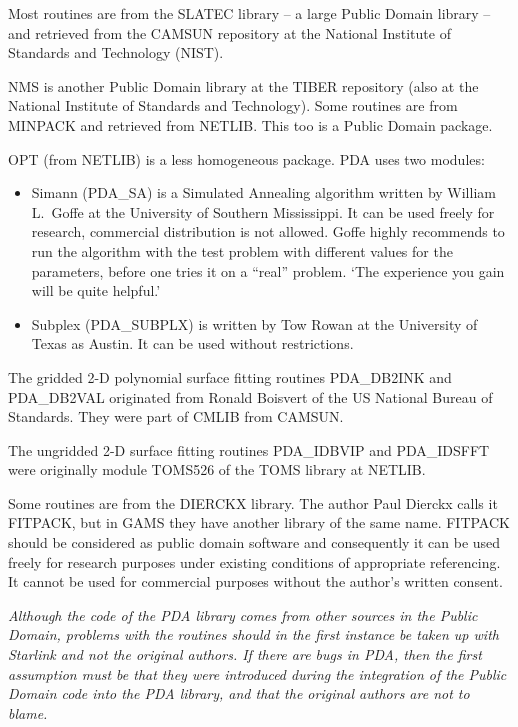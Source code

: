 \documentclass[11pt,twoside]{article}
\begin{document}
   Most routines are from the SLATEC library -- a large Public Domain
   library -- and retrieved from the CAMSUN repository at the National
   Institute of Standards and Technology (NIST).

   NMS is another Public Domain library at the TIBER repository (also at
   the National Institute of Standards and Technology).
   Some routines are from MINPACK and retrieved from NETLIB. This too is
   a Public Domain package.

   OPT (from NETLIB) is a less homogeneous package. PDA uses two modules:

\begin{itemize}
\item Simann (PDA\_SA) is a Simulated Annealing algorithm written by
   William L.\ Goffe at the University of Southern Mississippi. It can
   be used freely for research, commercial distribution is not allowed.
   Goffe highly recommends to run the 
   algorithm with the test problem with different values for the
   parameters, before one tries it on a ``real'' problem. `The experience
   you gain will be quite helpful.'
\item Subplex (PDA\_SUBPLX) is written by Tow Rowan at the University of
   Texas as Austin. It can be used without restrictions.
\end{itemize}

The gridded 2-D polynomial surface fitting 
routines PDA\_DB2INK and PDA\_DB2VAL originated from Ronald
Boisvert of the US National Bureau of Standards. They were
part of CMLIB from CAMSUN.

The ungridded 2-D surface fitting routines 
PDA\_IDBVIP and PDA\_IDSFFT were originally 
module TOMS526 of the TOMS library at NETLIB.

   Some routines are from the DIERCKX library. The author Paul Dierckx
   calls it FITPACK, but in GAMS they have another library of the same
   name. FITPACK should be considered
   as public domain software and consequently it can be used freely for
   research purposes under existing conditions of appropriate referencing.
   It cannot be used for commercial purposes without the author's
   written consent.

   {\em Although the code of the PDA library comes from other sources in
   the Public Domain, problems with the routines should in the first
   instance be taken up with Starlink and not the original authors. If
   there are bugs in PDA, then the first assumption must be that they
   were introduced during the integration of the Public Domain code into
   the PDA library, and that the original authors are not to blame.}
\end{document}

